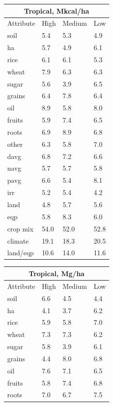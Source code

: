 \documentclass[12pt,twoside]{article}
\begin{document}
\begin{table}[h!]
\centering
\parbox{.45\linewidth} {
\begin{tabular}{llll}
\toprule
\multicolumn{4}{c}{\textbf{Tropical, Mkcal/ha}} \\
\midrule
Attribute & High & Medium & Low \\
\midrule
soil & 5.4 & 5.3 & 4.9 \\
ha & 5.7 & 4.9 & 6.1 \\
rice & 6.1 & 6.1 & 5.3 \\
wheat & 7.9 & 6.3 & 6.3 \\
sugar & 5.6 & 3.9 & 6.5 \\
grains & 6.4 & 7.8 & 6.4 \\
oil & 8.9 & 5.8 & 8.0 \\
fruits & 5.9 & 7.4 & 6.5 \\
roots & 6.9 & 8.9 & 6.8 \\
other & 6.3 & 5.8 & 7.0 \\
davg & 6.8 & 7.2 & 6.6 \\
navg & 5.7 & 5.7 & 5.8 \\
pavg & 6.6 & 5.4 & 8.1 \\
irr & 5.2 & 5.4 & 4.2 \\
land & 4.8 & 5.7 & 5.6 \\
eqp & 5.8 & 8.3 & 6.0 \\
\midrule
crop mix & 54.0 & 52.0 & 52.8 \\
climate & 19.1 & 18.3 & 20.5 \\
land/eqp & 10.6 & 14.0 & 11.6 \\
\bottomrule
\end{tabular}
\label{k.ny.trop_percentages}
}
\parbox{.45\linewidth} {
\centering
\begin{tabular}{llll}
\toprule
\multicolumn{4}{c}{\textbf{Tropical, Mg/ha}} \\
\midrule
Attribute & High & Medium & Low \\
\midrule
soil & 6.6 & 4.5 & 4.4 \\
ha & 4.1 & 3.7 & 6.2 \\
rice & 5.9 & 5.8 & 7.0 \\
wheat & 7.3 & 7.3 & 6.2 \\
sugar & 5.8 & 3.9 & 6.1 \\
grains & 4.4 & 8.0 & 6.8 \\
oil & 7.6 & 7.1 & 6.5 \\
fruits & 5.8 & 7.4 & 6.8 \\
roots & 7.0 & 6.7 & 7.5 \\

\end{tabular}}
\end{table}
\end{document}
